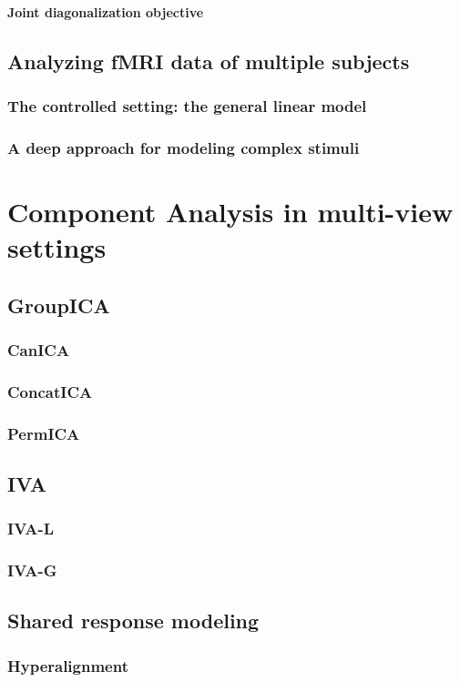 \documentclass[12pt]{report}
\begin{document}
\subsubsection{Joint diagonalization objective}
\section{Analyzing fMRI data of multiple subjects}
\subsection{The controlled setting: the general linear model}
\subsection{A deep approach for modeling complex stimuli}

\chapter{Component Analysis in multi-view settings}
\section{GroupICA}
\subsection{CanICA}
\subsection{ConcatICA}
\subsection{PermICA}
\section{IVA}
\subsection{IVA-L}
\subsection{IVA-G}
\section{Shared response modeling}
\subsection{Hyperalignment}
\end{document}
